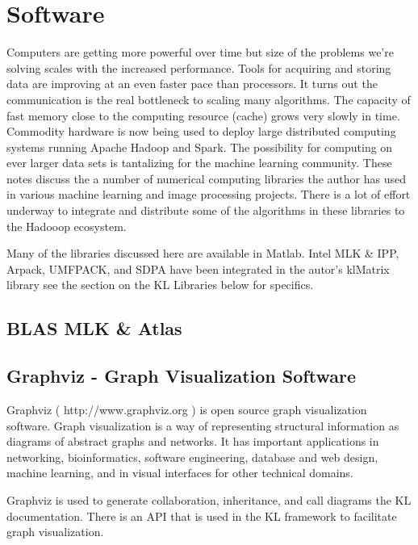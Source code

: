 
\chapter{Software}
Computers are getting more powerful over time but size of the problems we're solving scales with the increased performance. Tools for acquiring and storing data are improving at an even faster pace than processors.  It turns out the communication is the real bottleneck to scaling many algorithms. The capacity of fast memory close to the computing resource (cache) grows very slowly in time.  Commodity hardware is now being used to deploy large distributed computing systems running Apache Hadoop and Spark. The possibility for computing on ever larger data sets is tantalizing for the machine learning community.
These notes discuss the a number of numerical computing libraries the author has used in various machine learning and image processing projects.  There is a lot of effort underway to integrate and distribute some of the algorithms in these libraries to the Hadooop ecosystem. 

Many of the libraries discussed here are available in Matlab. Intel MLK \& IPP, Arpack, UMFPACK, and SDPA have been integrated in the autor's klMatrix library see the section on the KL Libraries below for specifics. 

\section{BLAS MLK \& Atlas}

\section{Graphviz - Graph Visualization Software}
Graphviz ( http://www.graphviz.org ) is open source graph visualization software. Graph visualization is a way of representing structural information as diagrams of abstract graphs and networks. It has important applications in networking, bioinformatics,  software engineering, database and web design, machine learning, and in visual interfaces for other technical domains.

Graphviz is used to generate collaboration, inheritance, and call diagrams the KL documentation. There is an API that is used in the KL framework to facilitate graph visualization.

